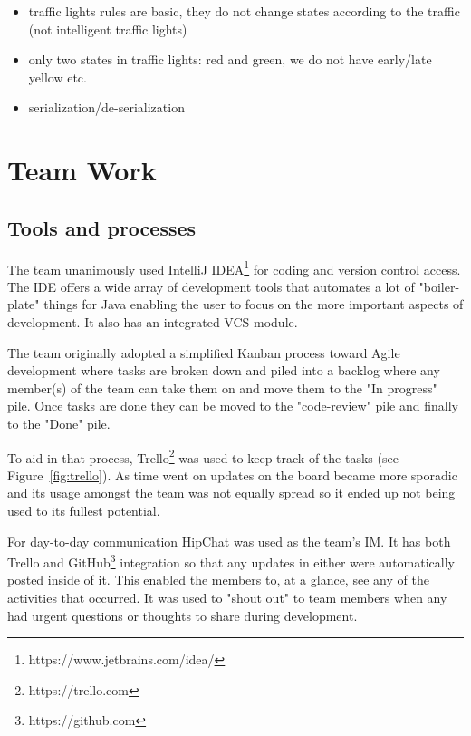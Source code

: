\begin{itemize}
        \item traffic lights rules are basic, they do not change states according to the traffic (not intelligent traffic lights)
        \item only two states in traffic lights: red and green, we do not have early/late yellow etc.
\end{itemize}
     
\begin{itemize}
	\item serialization/de-serialization
\end{itemize}

\section{Team Work}

\subsection{Tools and processes}

The team unanimously used IntelliJ IDEA\footnote{https://www.jetbrains.com/idea/} for coding and version control access. The IDE offers a wide array of development tools that automates a lot of "boiler-plate" things for Java enabling the user to focus on the more important aspects of development. It also has an integrated VCS module.

The team originally adopted a simplified Kanban\cite{Peterson2015, Radig2016} process toward Agile development where tasks are broken down and piled into a backlog where any member(s) of the team can take them on and move them to the "In progress" pile. Once tasks are done they can be moved to the "code-review" pile and finally to the "Done" pile.

To aid in that process, Trello\footnote{https://trello.com} was used to keep track of the tasks (see Figure~\ref{fig:trello}). As time went on updates on the board became more sporadic and its usage amongst the team was not equally spread so it ended up not being used to its fullest potential. 

For day-to-day communication HipChat was used as the team's IM. It has both Trello and GitHub\footnote{https://github.com} integration so that any updates in either were automatically posted inside of it. This enabled the members to, at a glance, see any of the activities that occurred. It was used to "shout out" to team members when any had urgent questions or thoughts to share during development.

